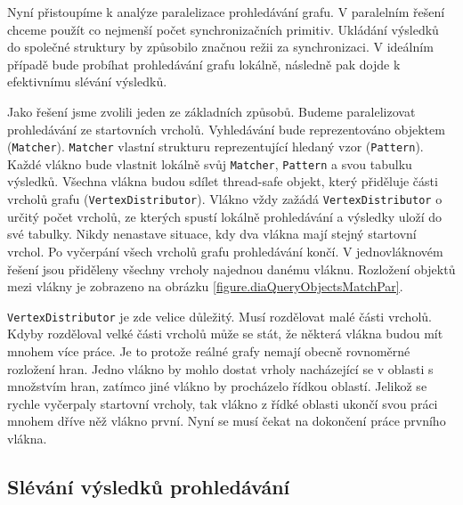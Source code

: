 Nyní přistoupíme k analýze paralelizace prohledávání grafu.
V paralelním řešení chceme použít co nejmenší počet synchronizačních primitiv.
Ukládání výsledků do společné struktury by způsobilo značnou režii za synchronizaci.
V ideálním případě bude probíhat prohledávání grafu lokálně, následně pak dojde k efektivnímu slévání výsledků.

Jako řešení jsme zvolili jeden ze základních způsobů.
Budeme paralelizovat prohledávání ze startovních vrcholů.
Vyhledávání bude reprezentováno objektem (\texttt{Matcher}).
\texttt{Matcher} vlastní strukturu reprezentující hledaný vzor (\texttt{Pattern}).
Každé vlákno bude vlastnit lokálně svůj \texttt{Matcher}, \texttt{Pattern} a svou tabulku výsledků.
Všechna vlákna budou sdílet thread-safe objekt, který přiděluje části vrcholů grafu (\texttt{VertexDistributor}).
Vlákno vždy zažádá \texttt{VertexDistributor} o určitý počet vrcholů, ze kterých spustí lokálně prohledávání a výsledky uloží do své tabulky.
Nikdy nenastave situace, kdy dva vlákna mají stejný startovní vrchol.
Po vyčerpání všech vrcholů grafu prohledávání končí.
V jednovláknovém řešení jsou přiděleny všechny vrcholy najednou danému vláknu. 
Rozložení objektů mezi vlákny je zobrazeno na obrázku \ref{figure.diaQueryObjectsMatchPar}. 

\texttt{VertexDistributor} je zde velice důležitý.
Musí rozdělovat malé části vrcholů.
Kdyby rozděloval velké části vrcholů může se stát, že některá vlákna budou mít mnohem více práce.
Je to protože reálné grafy nemají obecně rovnoměrné rozložení hran.
Jedno vlákno by mohlo dostat vrholy nacházející se v oblasti s množstvím hran, zatímco jiné vlákno by procházelo řídkou oblastí.
Jelikož se rychle vyčerpaly startovní vrcholy, tak vlákno z řídké oblasti ukončí svou práci mnohem dříve něž vlákno první.
Nyní se musí čekat na dokončení práce prvního vlákna.

\subsection{Slévání výsledků prohledávání}

